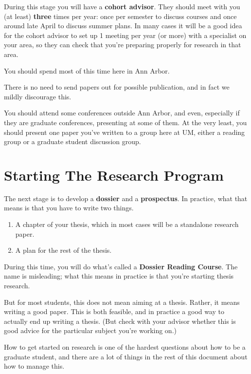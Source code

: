 \documentclass[]{book}
\providecommand{\tightlist}{%
  \setlength{\itemsep}{0pt}\setlength{\parskip}{0pt}}
\begin{document}
During this stage you will have a \textbf{cohort advisor}. They should meet with you (at least) \textbf{three} times per year: once per semester to discuss courses and once around late April to discuss summer plans. In many cases it will be a good idea for the cohort advisor to set up 1 meeting per year (or more) with a specialist on your area, so they can check that you're preparing properly for research in that area.

You should spend most of this time here in Ann Arbor.

There is no need to send papers out for possible publication, and in fact we mildly discourage this.

You should attend some conferences outside Ann Arbor, and even, especially if they are graduate conferences, presenting at some of them. At the very least, you should present one paper you've written to a group here at UM, either a reading group or a graduate student discussion group.

\hypertarget{starting-the-research-program}{%
\section{Starting The Research Program}\label{starting-the-research-program}}

The next stage is to develop a \textbf{dossier} and a \textbf{prospectus}. In practice, what that means is that you have to write two things.

\begin{enumerate}
\def\labelenumi{\arabic{enumi}.}
\tightlist
\item
  A chapter of your thesis, which in most cases will be a standalone research paper.
\item
  A plan for the rest of the thesis.
\end{enumerate}

During this time, you will do what's called a \textbf{Dossier Reading Course}. The name is misleading; what this means in practice is that you're starting thesis research.

But for most students, this does not mean aiming at a thesis. Rather, it means writing a good paper. This is both feasible, and in practice a good way to actually end up writing a thesis. (But check with your advisor whether this is good advice for the particular subject you're working on.)

How to get started on research is one of the hardest questions about how to be a graduate student, and there are a lot of things in the rest of this document about how to manage this.
\end{document}
